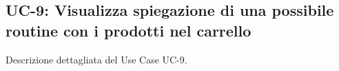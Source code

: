 \subsection{UC-9: Visualizza spiegazione di una possibile routine con i prodotti nel carrello}

Descrizione dettagliata del Use Case UC-9.
